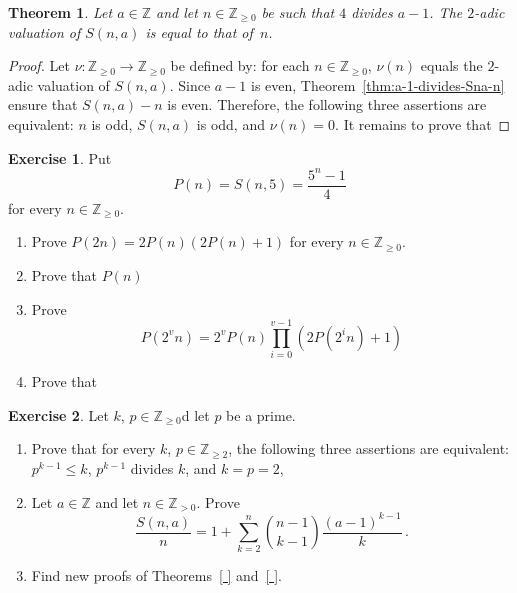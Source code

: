 \documentclass[12pt]{article}
\newcommand{\bZ}{\mathbb{Z}}
\newcommand{\bN}{\bZ_{\ge 0}}%
\newcommand{\bNast}{ \bZ_{> 0}} %
\newtheorem{theorem}{Theorem}
\theoremstyle{definition}
\newtheorem{exercise}{Exercise}
\begin{document}
\begin{theorem}
  Let $a \in \bZ$ and let $n \in \bN$ be such that $4$ divides $a - 1$.
  The $2$-adic valuation of $S(n, a)$ is equal to that of~$n$.
\end{theorem}

\begin{proof}
  Let $\nu\colon \bN \to \bN$ be defined by:
  for each $n \in \bN$, $\nu(n)$ equals the $2$-adic valuation of $S(n, a)$.
  Since $a - 1$ is even, Theorem~\ref{thm:a-1-divides-Sna-n} ensure that $S(n, a) - n$ is even.
  Therefore, the following three assertions are equivalent: $n$ is odd, $S(n, a)$ is odd, and $\nu(n) = 0$.
  It remains to prove that 
  

\end{proof}


\begin{exercise}
Put
$$
P(n) = S(n, 5) = \frac{5^n - 1}{4}
$$
for every $n \in \bN$.
\begin{enumerate}
  \item Prove $P(2n) = 2 P(n) (2 P(n) + 1)$ for every $n \in \bN$.
  \item Prove that $P(n)$ 
  \item Prove
  $$
  P(2^v n ) = 2^v P(n) \prod_{i = 0}^{v - 1}  (2 P(2^i n) + 1)  
  $$
  \item Prove that 
  \end{enumerate}
\end{exercise} 

\begin{exercise}
  Let $k$, $p \in \bN$d let $p$ be a prime.
  \begin{enumerate}
  \item Prove that for every $k$, $p \in \bZ_{\ge 2}$, the following three assertions are equivalent:
    $p^{k - 1} \le k$, $p^{k - 1}$ divides $k$, and $k = p = 2$, 
  \item Let $a \in \bZ$ and let $n \in \bNast$.
    Prove 
   $$
  \frac{S(n, a)}{n}  = 1 + \sum_{k = 2}^n \binom{n - 1}{k - 1} \frac{{(a - 1)}^{k - 1}}{k}  \, . 
  $$
 \item Find new proofs of Theorems~\ref{ } and~\ref{ }.
  \end{enumerate}
\end{exercise} 
%
\end{document}
